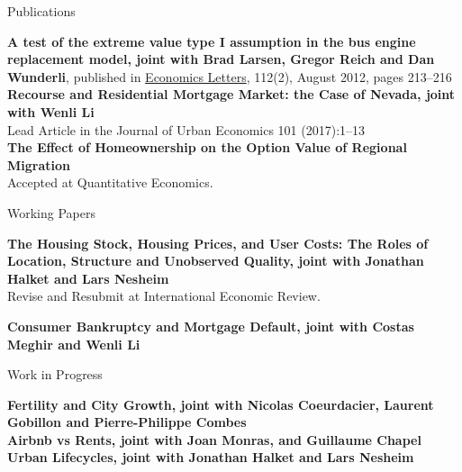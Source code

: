 \documentclass{cvjobmarket} %
\begin{document}

\begin{rSection}{Publications}

{\textbf{A test of the extreme value type I assumption in the bus engine replacement model, joint with Brad Larsen, Gregor Reich and Dan Wunderli}, published in \href{http://www.sciencedirect.com/science/article/pii/S0165176512000870}{Economics Letters}, 112(2), August 2012, pages 213--216}\\ 


{\textbf{Recourse and Residential Mortgage Market: the Case of Nevada, joint with Wenli Li}} \\
{Lead Article in the Journal of Urban Economics 101 (2017):1–13}\\

{\textbf{The Effect of Homeownership on the Option Value of Regional Migration}}\\
{Accepted at Quantitative Economics.}


\end{rSection}

\begin{rSection}{Working Papers}

{\textbf{The Housing Stock, Housing Prices, and User Costs: The Roles of Location, Structure and Unobserved Quality, joint with Jonathan Halket and Lars Nesheim}} \\
{Revise and Resubmit at International Economic Review.}

{\textbf{Consumer Bankruptcy and Mortgage Default, joint with Costas Meghir and Wenli Li}} \\



\end{rSection}
\begin{rSection}{Work in Progress}

{\textbf{Fertility and City Growth, joint with Nicolas Coeurdacier, Laurent Gobillon and Pierre-Philippe Combes}} \\

{\textbf{Airbnb vs Rents, joint with Joan Monras, and Guillaume Chapel}} \\

{\textbf{Urban Lifecycles, joint with Jonathan Halket and Lars Nesheim}} \\

\end{rSection}
\end{document}
